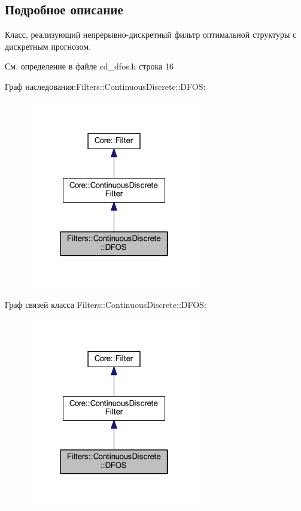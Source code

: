 \subsection{Подробное описание}
Класс, реализующий непрерывно-\/дискретный фильтр оптимальной структуры с дискретным прогнозом. 

См. определение в файле cd\+\_\+dfos.\+h строка 16



Граф наследования\+:Filters\+:\+:Continuous\+Discrete\+:\+:D\+F\+OS\+:
\nopagebreak
\begin{figure}[H]
\begin{center}
\leavevmode
\includegraphics[width=214pt]{class_filters_1_1_continuous_discrete_1_1_d_f_o_s__inherit__graph}
\end{center}
\end{figure}


Граф связей класса Filters\+:\+:Continuous\+Discrete\+:\+:D\+F\+OS\+:
\nopagebreak
\begin{figure}[H]
\begin{center}
\leavevmode
\includegraphics[width=214pt]{class_filters_1_1_continuous_discrete_1_1_d_f_o_s__coll__graph}
\end{center}
\end{figure}



